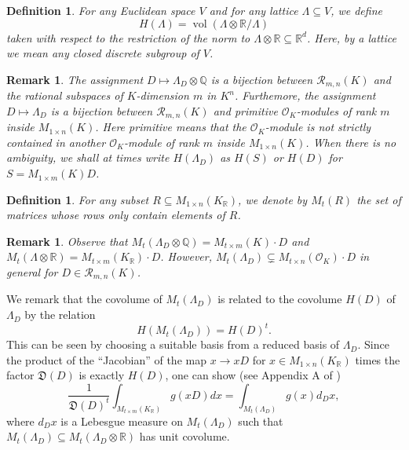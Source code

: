 \documentclass{amsart}
\newtheorem{definition}[theorem]{Definition}
\newtheorem{remark}[theorem]{Remark}
\newcommand{\OK}{\mathcal{O}_K}
\DeclareMathOperator{\vol}{vol}
\begin{document}
\begin{definition}
	\label{de:height_definition}
For any Euclidean space $V$ and for any lattice $\Lambda \subseteq V$, we define 
\begin{equation}
  H(\Lambda)  = \vol(\Lambda \otimes \mathbb{R} /\Lambda)
\end{equation}
taken with respect to the restriction of the norm to $ \Lambda \otimes \mathbb{R} \subseteq \mathbb{R}^{d}$. Here, by a lattice we mean any closed discrete subgroup of $V$.
\end{definition}

\begin{remark}
The assignment $D \mapsto \Lambda_D \otimes \mathbb{Q}$ 
is a bijection between $\mathcal{R}_{m,n}(K)$ and the rational subspaces of $K$-dimension $m$ in $K^{n}$.
Furthemore, the assignment $D \mapsto \Lambda_D$ is a bijection between $\mathcal{R}_{m,n}(K)$ and primitive $\OK$-modules of rank $m$ inside $M_{1 \times n}(K)$. Here primitive means that the $\OK$-module is not strictly contained in another $\OK$-module of rank $m$ inside $M_{1 \times n}(K)$. When there is no ambiguity, we shall at times write $H(\Lambda_D)$ as $H(S)$ or $H(D)$ for $S=M_{1 \times m}(K) D$.
\end{remark}


\begin{definition}
	\label{de:defi_of_M_t}
	For any subset $R \subseteq M_{1 \times n}(K_\mathbb{R})$, we denote by $M_{t}(R)$ the set of matrices whose rows only contain elements of $R$.
\end{definition}


\begin{remark}
Observe that $M_{t}(\Lambda_D \otimes \mathbb{Q}) = M_{t \times m}(K) \cdot D$ 
and $M_{t}(\Lambda \otimes \mathbb{R}) = M_{t \times m}(K_\mathbb{R}) \cdot D$. However, $M_t(\Lambda_D) \subsetneq  M_{t \times n}(\OK) \cdot D$ in general for $D \in \mathcal{R}_{m,n}(K)$.
\end{remark}

We remark that the covolume of $M_t(\Lambda_D)$ is related to the covolume $H(D)$ of $\Lambda_D$ by the relation$$H(M_t(\Lambda_D))=H(D)^t.$$
This can be seen by choosing a suitable basis from a reduced basis of $\Lambda_D$.
Since the product of the ``Jacobian'' of the map $x \rightarrow x D$ for $x \in M_{1 \times n}(K_\mathbb{R})$ times the factor $\mathfrak{D}(D)$ is exactly $H(D)$, 
one can show (see Appendix A of \cite{GSV23})
\begin{equation}
  \frac{1}{\mathfrak{D}(D)^{t}} \int_{M_{t\times m}(K_\mathbb{R})} g( x D)dx = \int_{M_t( \Lambda_D )} g(x)d_{D}x,
  \label{eq:d_D_defined}
\end{equation}
where $d_D x$ is a Lebesgue measure on $M_t(\Lambda_D)$ such that $M_t(\Lambda_D) \subseteq M_t(\Lambda_D \otimes \mathbb{R})$
has unit covolume. 
\end{document}
